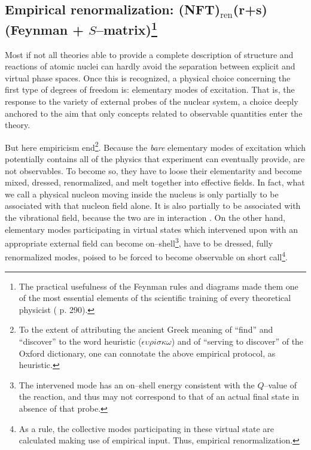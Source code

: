 \subsection[Empirical renormalization: (NFT)$_{\text{ren}}$(r+s) (Feynman + $S$--matrix)]{Empirical renormalization: (NFT)$_{\text{ren}}$(r+s) (Feynman + $S$--matrix)\footnote{The practical usefulness of the Feynman rules and diagrams made them one of the most essential elements of ths scientific training of every theoretical physicist (\cite{Mehra:96} p. 290).}} 
Most if not all theories able to provide a complete description of structure and reactions of atomic nuclei can hardly avoid the separation between explicit and virtual phase spaces. Once this is recognized, a physical choice concerning the first type of degrees of freedom is: elementary modes of excitation. That is, the response to the variety of external probes of the nuclear system, a choice deeply anchored to the aim that only concepts related to observable quantities enter the theory.

But here empiricism end\footnote{To the extent of attributing the ancient Greek meaning of ``find'' and ``discover'' to the word heuristic ($\epsilon\upsilon\rho i \sigma\kappa\omega$) and of ``serving to discover'' of the Oxford dictionary, one can connotate the above empirical protocol, as heuristic.}. Because the \textit{bare} elementary modes of excitation which potentially contains all of the physics that experiment can eventually provide, are not observables. To become so, they have to loose their elementarity and become mixed, dressed, renormalized, and melt together into effective fields. In fact, what we call a physical nucleon moving inside the nucleus is only partially to be associated with that nucleon field alone. It is also partially to be associated with the vibrational field, because the two are in interaction . On the other hand, elementary modes participating in virtual states which intervened upon with an appropriate external field can become on--shell\footnote{The intervened mode has an on--shell energy consistent with the $Q$--value of the reaction, and thus may not correspond to that of an actual final state in absence of that probe.\label{footnote2}}, have to be dressed, fully renormalized modes, poised to be forced to become observable on short call\footnote{As a rule, the collective modes participating in these virtual state are calculated making use of empirical input. Thus, empirical renormalization.}.


